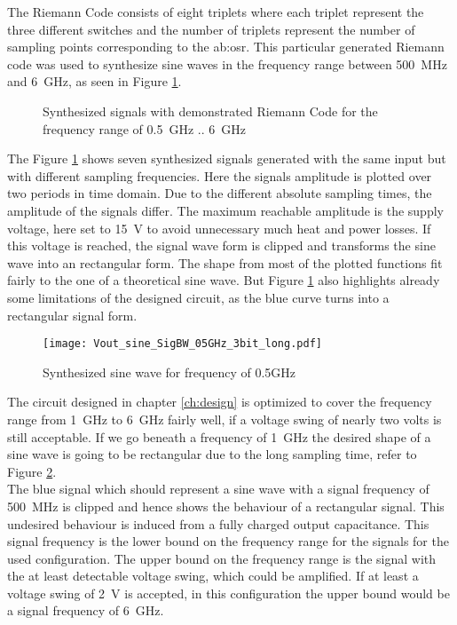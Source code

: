  The Riemann Code consists of eight triplets where each triplet represent the three different switches and the number of triplets represent the number of sampling points corresponding to the \gls{ab:osr}.
This particular generated Riemann code was used to synthesize sine waves in the frequency range between \SI{500}{\MHz} and \SI{6}{\GHz}, as seen in Figure \ref{fig:7SignalsSameSlopeInOnePlot}.


\begin{figure}[htb!]
   \centering 
   
   \caption{Synthesized signals with demonstrated Riemann Code for the frequency range of \SI{0.5}{\GHz} .. \SI{6}{\GHz}}
   \label{fig:7SignalsSameSlopeInOnePlot}
\end{figure}

The Figure \ref{fig:7SignalsSameSlopeInOnePlot} shows seven synthesized signals generated with the same input but with different sampling frequencies. 
Here the signals amplitude is plotted over two periods in time domain.
Due to the different absolute sampling times, the amplitude of the signals differ.
The maximum reachable amplitude is the supply voltage, here set to \SI{15}{\volt} to avoid unnecessary much heat and power losses. 
If this voltage is reached, the signal wave form is clipped and transforms the sine wave into an rectangular form.
The shape from most of the plotted functions fit fairly to the one of a theoretical sine wave.
But Figure \ref{fig:7SignalsSameSlopeInOnePlot} also highlights already some limitations of the designed circuit, as the blue curve turns into a rectangular signal form.\\

\begin{figure}[htb!]
   \centering
   \texttt{[image: Vout\_sine\_SigBW\_05GHz\_3bit\_long.pdf]}
   \caption{Synthesized sine wave for frequency of 0.5GHz}
   \label{fig:SineWave05GHz}
\end{figure}

The circuit designed in chapter \ref{ch:design} is optimized to cover the frequency range from \SI{1}{\GHz} to \SI{6}{\GHz} fairly well, if a voltage swing of nearly  two volts is still acceptable.
If we go beneath a frequency of \SI{1}{\GHz} the desired shape of a sine wave is going to be rectangular due to the long sampling time, refer to Figure \ref{fig:SineWave05GHz}.\\
The blue signal which should represent a sine wave with a signal frequency of \SI{500}{\MHz} is clipped and hence shows the behaviour of a rectangular signal.
 This undesired behaviour is induced from a fully charged output capacitance.
 This signal frequency is the lower bound on the frequency range for the signals for the used configuration.
The upper bound on the frequency range is the signal with the at least detectable voltage swing, which could be amplified.
If at least a voltage swing of \SI{2}{\volt} is accepted, in this configuration the upper bound would be a signal frequency of \SI{6}{\GHz}.\\


